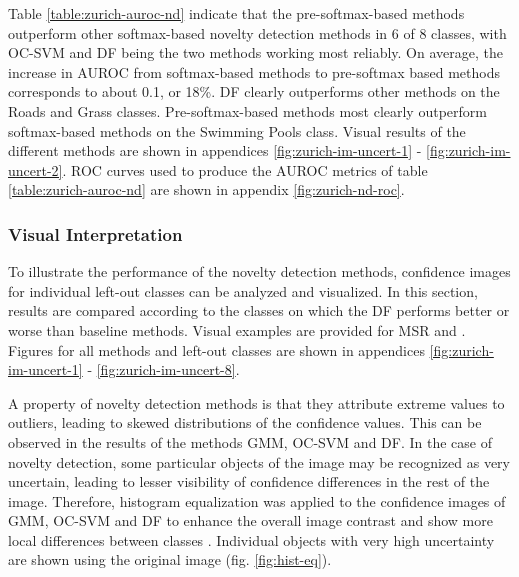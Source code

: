 \documentclass[10pt]{article}
\begin{document}
Table \ref{table:zurich-auroc-nd} indicate that the pre-softmax-based methods outperform other softmax-based novelty detection methods in 6 of 8 classes, with \gls{OC-SVM} and \gls{DF} being the two methods working most reliably. On average, the increase in AUROC from softmax-based methods to pre-softmax based methods corresponds to about 0.1, or 18\%.  \gls{DF} clearly outperforms other methods on the Roads and Grass classes. Pre-softmax-based methods most clearly outperform softmax-based methods on the Swimming Pools class. Visual results of the different methods are shown in appendices \ref{fig:zurich-im-uncert-1} - \ref{fig:zurich-im-uncert-2}. \gls{ROC} curves used to produce the \gls{AUROC} metrics of table \ref{table:zurich-auroc-nd} are shown in appendix \ref{fig:zurich-nd-roc}.

\subsubsection{Visual Interpretation}

To illustrate the performance of the novelty detection methods, confidence images for individual left-out classes can be analyzed and visualized. In this section, results are compared according to the classes on which the \acrlong{DF} performs better or worse than baseline methods. Visual examples are provided for MSR and . Figures for all methods and left-out classes are shown in appendices \ref{fig:zurich-im-uncert-1} - \ref{fig:zurich-im-uncert-8}.

A property of novelty detection methods is that they attribute extreme values to outliers, leading to skewed distributions of the confidence values. This can be observed in the results of the methods \gls{GMM}, \gls{OC-SVM} and \gls{DF}. In the case of novelty detection, some particular objects of the image may be recognized as very uncertain, leading to lesser visibility of confidence differences in the rest of the image. Therefore, histogram equalization was applied to the confidence images of \gls{GMM}, \gls{OC-SVM} and \gls{DF} to enhance the overall image contrast and show more local differences between classes \cite{Gonzlez2012DigitalIP}. Individual objects with very high uncertainty are shown using the original image (fig.  \ref{fig:hist-eq}).
\end{document}
